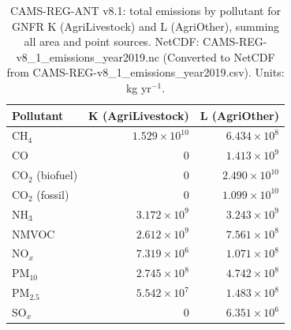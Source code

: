 
\begin{table}[htbp]
\centering
\caption{CAMS-REG-ANT v8.1: total emissions by pollutant for GNFR K (AgriLivestock) and L (AgriOther), summing all area and point sources. NetCDF: CAMS-REG-v8\_1\_emissions\_year2019.nc (Converted to NetCDF from CAMS-REG-v8\_1\_emissions\_year2019.csv). Units: kg yr$^{-1}$.}
\label{tab:cams_kl_totals}
\begin{tabular}{lrr}
\hline
Pollutant & K (AgriLivestock) & L (AgriOther) \\
\hline
CH$_4$ & $1.529 \times 10^{10}$ & $6.434 \times 10^{8}$ \\
CO & $0$ & $1.413 \times 10^{9}$ \\
CO$_{2}$ (biofuel) & $0$ & $2.490 \times 10^{10}$ \\
CO$_{2}$ (fossil) & $0$ & $1.099 \times 10^{10}$ \\
NH$_3$ & $3.172 \times 10^{9}$ & $3.243 \times 10^{9}$ \\
NMVOC & $2.612 \times 10^{9}$ & $7.561 \times 10^{8}$ \\
NO$_x$ & $7.319 \times 10^{6}$ & $1.071 \times 10^{8}$ \\
PM$_{10}$ & $2.745 \times 10^{8}$ & $4.742 \times 10^{8}$ \\
PM$_{2.5}$ & $5.542 \times 10^{7}$ & $1.483 \times 10^{8}$ \\
SO$_x$ & $0$ & $6.351 \times 10^{6}$ \\
\hline
\end{tabular}
\end{table}

